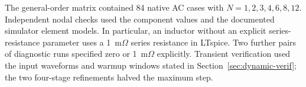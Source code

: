 The general-order matrix contained 84 native AC cases with $N=1,2,3,4,6,8,12$. Independent nodal checks used the component values and the documented simulator element models. In particular, an inductor without an explicit series-resistance parameter uses a 1~m$\Omega$ series resistance in LTspice. Two further pairs of diagnostic runs specified zero or 1~m$\Omega$ explicitly. Transient verification used the input waveforms and warmup windows stated in Section~\ref{sec:dynamic-verif}; the two four-stage refinements halved the maximum step.

\FloatBarrier
